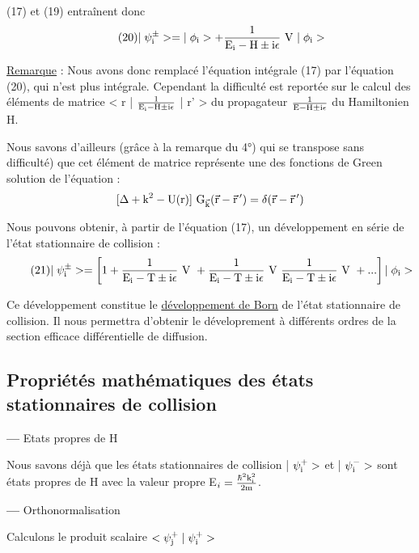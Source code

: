 (17) et (19) entraînent donc
\[
\tag{20}|\;\psi_{\text{i}}^\pm>=|\;\phi_{\text{i}}>+\frac{1}{\text{E}_{\text{i}}-\text{H}\pm\text{i}\epsilon}\text{ V }|\;\phi_{\text{i}}>
\]

\ul{Remarque} :
Nous avons donc remplacé l'équation intégrale (17) par l'équation (20),
qui n'est plus intégrale. Cependant la difficulté est reportée sur le calcul des
éléments de matrice < r | $\frac{1}{\text{E}_{\text{i}}-\text{H}\pm\text{i}\epsilon}$ | r' > du propagateur
$\frac{1}{\text{E}-\text{H}\pm\text{i}\epsilon}$ du Hamiltonien H.


Nous savons d'ailleurs (grâce à la remarque du 4°) qui se transpose sans difficulté)
que cet élément de matrice représente une des fonctions
de Green solution de l'équation :
\[
[\Delta+\text{k}^2-\text{U(r)}]\text{ G}_{\vec{\text{k}}}(\vec{\text{r}}-\vec{\text{r}}\,')
=\delta(\vec{\text{r}}-\vec{\text{r}}\,')
\]

Nous pouvons obtenir, à partir de l'équation (17), un développement en série de
l'état stationnaire de collision :
\[
\tag{21}|\;\psi_{\text{i}}^\pm>=\left[1+\frac{1}{\text{E}_{\text{i}}-\text{T}\pm\text{i}\epsilon}\text{ V }+\frac{1}{\text{E}_{\text{i}}-\text{T}\pm\text{i}\epsilon}\text{ V }\frac{1}{\text{E}_{\text{i}}-\text{T}\pm\text{i}\epsilon}\text{ V }+...\right]|\;\phi_{\text{i}}>
\]

Ce développement constitue le \ul{développement de Born} de l'état stationnaire
de collision. Il nous permettra d'obtenir le déveloprement à différents
ordres de la section efficace différentielle de diffusion.

\subsection{Propriétés mathématiques des états stationnaires de collision}%
{\bf—} Etats propres de H

Nous savons déjà que les états stationnaires de collision | $\psi_{\text{i}}^+>$
et | $\psi_{\text{i}}^->$ sont états propres de H avec la valeur propre E$_i=\frac{\hbar^2\text{k}_{\text{i}}^2}{2\text{m}}$.

{\bf—} Orthonormalisation

Calculons le produit scalaire $<\psi_{\text{j}}^+\;|\;\psi_{\text{i}}^+>$

